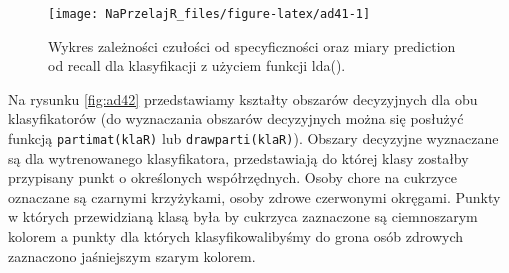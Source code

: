 \documentclass[polish,]{book}
\newenvironment{Shaded}{\begin{snugshade}}{\end{snugshade}}
\newcommand{\CommentTok}[1]{\textcolor[rgb]{0.56,0.35,0.01}{\textit{#1}}}
\newcommand{\DataTypeTok}[1]{\textcolor[rgb]{0.13,0.29,0.53}{#1}}
\newcommand{\DecValTok}[1]{\textcolor[rgb]{0.00,0.00,0.81}{#1}}
\newcommand{\KeywordTok}[1]{\textcolor[rgb]{0.13,0.29,0.53}{\textbf{#1}}}
\newcommand{\NormalTok}[1]{#1}
\newcommand{\OperatorTok}[1]{\textcolor[rgb]{0.81,0.36,0.00}{\textbf{#1}}}
\newcommand{\StringTok}[1]{\textcolor[rgb]{0.31,0.60,0.02}{#1}}
\begin{document}
\begin{Shaded}
\end{Shaded}

\begin{figure}[h]

{\centering \texttt{[image: NaPrzelajR\_files/figure-latex/ad41-1]} 

}

\caption{Wykres zależności czułości od specyficzności oraz miary prediction od recall dla klasyfikacji z użyciem funkcji lda().}\label{fig:ad41}
\end{figure}

Na rysunku \ref{fig:ad42} przedstawiamy kształty obszarów decyzyjnych dla obu klasyfikatorów (do wyznaczania obszarów decyzyjnych można się posłużyć funkcją \texttt{partimat(klaR)}
lub \texttt{drawparti(klaR)}). Obszary decyzyjne wyznaczane są dla wytrenowanego klasyfikatora, przedstawiają do której klasy zostałby przypisany punkt o określonych
współrzędnych. Osoby chore na cukrzyce oznaczane są czarnymi krzyżykami, osoby
zdrowe czerwonymi okręgami. Punkty w których przewidzianą klasą była by cukrzyca zaznaczone są ciemnoszarym kolorem a punkty dla których klasyfikowalibyśmy
do grona osób zdrowych zaznaczono jaśniejszym szarym kolorem.
\end{document}
